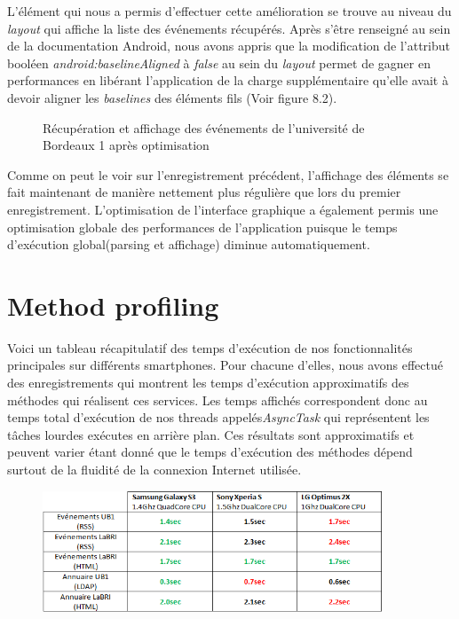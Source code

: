 L'élément qui nous a permis d'effectuer cette amélioration se trouve au niveau du \textit{layout} qui affiche la liste des événements récupérés. Après s'être renseigné au sein de la documentation Android, nous avons appris que la  modification de l'attribut booléen \textit{android:baselineAligned} à \textit{false} au sein du \textit{layout} permet de gagner en performances en libérant l'application de la charge supplémentaire qu'elle avait à devoir aligner les \textit{baselines} des éléments fils (Voir figure 8.2).

\begin{figure}[h!]
  \label{fig:systrace_optim}
  \center
  \setlength\fboxsep{5pt}
  \setlength\fboxrule{0.5pt}
  \caption{Récupération et affichage des événements de l'université de Bordeaux 1 après optimisation}
\end{figure}

Comme on peut le voir sur l'enregistrement précédent, l'affichage des éléments se fait maintenant de manière nettement plus régulière que lors du premier enregistrement. L'optimisation de l'interface graphique a également permis une optimisation globale des performances de l'application puisque le temps d'exécution global(parsing et affichage) diminue automatiquement. 

\section{Method profiling}
Voici un tableau récapitulatif des temps d’exécution de nos fonctionnalités principales sur différents smartphones. Pour chacune d'elles, nous avons effectué des enregistrements qui montrent les temps d'exécution approximatifs des méthodes qui réalisent ces services. Les temps affichés correspondent donc au temps total d'exécution de nos threads appelés\textit{AsyncTask} qui représentent les tâches lourdes exécutes en arrière plan. Ces résultats sont approximatifs et peuvent varier étant donné que le temps d’exécution des méthodes dépend surtout de la fluidité de la connexion Internet utilisée.\\

\begin{figure}[h!]
  \label{fig:benchmark}
  \center
  \includegraphics[width=0.9\textwidth]{resources/benchmark.png}
\end{figure}

